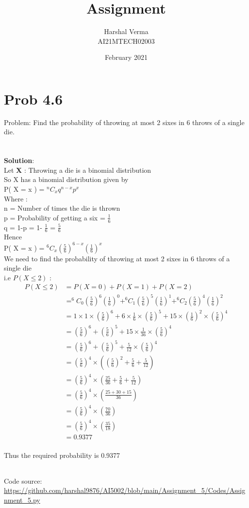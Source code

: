 \documentclass[journal,12pt,twocolumn]{IEEEtran}
\title{Assignment }
\author{Harshal Verma\\
AI21MTECH02003}
\date{February 2021}
\begin{document}
\maketitle
\section{Prob 4.6}
Problem: Find the probability of throwing at most 2 sixes in 6 throws of a single die.\\
\\
\\
\textbf{Solution}:\\
Let \textbf{X} :
Throwing a die is a binomial distribution\\
So X has a binomial distribution given by \\
P( X = x ) = $^{n}C_x q^{n-x} p^x $\\
Where : \\
n = Number of times the die is thrown \\
p = Probability of getting a six = $\frac{1}{6}$\\
q = 1-p = 1- $\frac{1}{6}$ = $\frac{5}{6}$ \\
Hence \\
P( X = x ) = $^{6}C_x (\frac{5}{6})^{6-x} (\frac{1}{6})^x $\\
We need to find the probability of throwing at most 2 sixes in 6 throws of a single die \\
i.e $P(X \leq 2)$ : \\
\begin{align*}
P(X \leq 2) &= P(X = 0) + P(X = 1) + P(X = 2) \\
&= ^{6}C_0 (\frac{5}{6})^{6} (\frac{1}{6})^0 + ^{6}C_1 (\frac{5}{6})^{5} (\frac{1}{6})^1 + ^{6}C_2 (\frac{5}{6})^{4} (\frac{1}{6})^2\\
&= 1\times1\times(\frac{5}{6})^6 + 6 \times \frac{1}{6} \times (\frac{5}{6})^5 + 15 \times (\frac{1}{6})^2 \times (\frac{5}{6})^4 \\
&= (\frac{5}{6})^6 + (\frac{5}{6})^5 + 15\times \frac{1}{36} \times (\frac{5}{6})^4 \\
&= (\frac{5}{6})^6 + (\frac{5}{6})^5 + \frac{5}{12} \times (\frac{5}{6})^4 \\
&= (\frac{5}{6})^4 \times ((\frac{5}{6})^2 + \frac{5}{6} + \frac{5}{12})\\
&= (\frac{5}{6})^4 \times (\frac{25}{36} + \frac{5}{6} + \frac{5}{12})\\
&= (\frac{5}{6})^4 \times (\frac{25+ 30 +15}{36}) \\
&= (\frac{5}{6})^4 \times (\frac{70}{36})\\
&= (\frac{5}{6})^4 \times (\frac{35}{18})\\
&= 0.9377\\
\end{align*}

Thus the required probability is 0.9377 \\
\\
\begin{tcolorbox}
Code source: \url{https://github.com/harshal9876/AI5002/blob/main/Assignment_5/Codes/Assignment_5.py}
\end{tcolorbox}
\\
\end{document}

